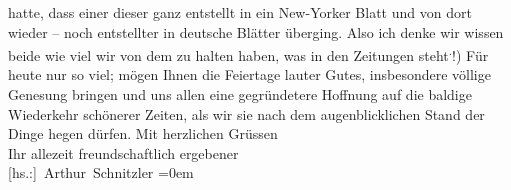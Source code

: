 \begin{ledgroupsized}[t]{13cm}
               hatte, dass einer dieser \label{K_L02224_4v}\label{K_L02224_4h} ganz entstellt in ein New-Yorker Blatt und von dort
               wieder \introOben{}–\introOben{} noch entstellter in deutsche Blätter überging.
               Also ich denke wir wissen beide wie viel wir von dem zu halten haben, was in den
               Zeitungen steht\substVorne{}\textsuperscript{.}\substDazwischen{}!\substHinten{}\introOben{})\introOben{}\pend
           \pstart
           Für heute nur so viel; mögen Ihnen die Feiertage lauter Gutes, insbesondere völlige
               Genesung bringen und uns allen eine gegründetere Hoffnung auf die baldige Wiederkehr
               schönerer Zeiten, als wir sie nach dem augenblicklichen Stand der Dinge hegen
               dürfen.\pend
           \pstart
           Mit herzlichen Grüssen{\\[\baselineskip]}Ihr allezeit freundschaftlich ergebener{\\[\baselineskip]}\spacefill\mbox{{[}hs.:{]} Arthur Schnitzler}\pend
           \leftskip=0em{}
         
         \endnumbering{}\end{ledgroupsized}  \newcommand{\dateiname}{L02224}\newcommand{\titel}{Arthur Schnitzler an Georg Brandes, 22. 12. 1915}\newcommand{\editorInnen}{Martin Anton Müller und Gerd-Hermann Susen}
      